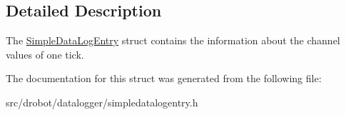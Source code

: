 \subsection{Detailed Description}
The \hyperlink{structdrobot_1_1datalogger_1_1SimpleDataLogEntry}{Simple\-Data\-Log\-Entry} struct contains the information about the channel values of one tick. 

The documentation for this struct was generated from the following file\-:\begin{DoxyCompactItemize}
\item 
src/drobot/datalogger/simpledatalogentry.\-h\end{DoxyCompactItemize}
